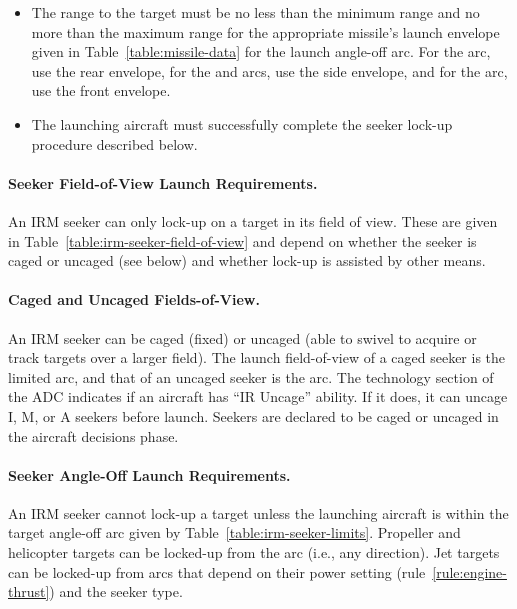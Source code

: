 {\begin{itemize}
    \item The range to the target must be no less than the minimum range and no more than the maximum range for the appropriate missile’s launch envelope given in Table~\ref{table:missile-data} for the launch angle-off arc. For the  arc, use the rear envelope, for the  and  arcs, use the side envelope, and for the  arc, use the front envelope.
    
    \item The launching aircraft must successfully complete the seeker lock-up procedure described below.
    
\end{itemize}

\paragraph{Seeker Field-of-View Launch Requirements.} 
An IRM seeker can only lock-up on a target in its field of view. These are given in Table~\ref{table:irm-seeker-field-of-view} and depend on whether the seeker is caged or uncaged (see below) and whether lock-up is assisted by other means.

\paragraph{Caged and Uncaged Fields-of-View.} \label{rule:ir-uncage} 
An IRM seeker can be caged (fixed) or uncaged (able to swivel to acquire or track targets over a larger field). The launch field-of-view of a caged seeker is the limited arc, and that of an uncaged seeker is the  arc. The technology section of the ADC indicates if an aircraft has “IR Uncage” ability. If it does, it can uncage I, M, or A seekers before launch. Seekers are declared to be caged or uncaged in the aircraft decisions phase.





\paragraph{Seeker Angle-Off Launch Requirements.} An IRM seeker cannot lock-up a target unless the launching aircraft is within the target angle-off arc given by Table~\ref{table:irm-seeker-limits}. Propeller and helicopter targets can be locked-up from the  arc (i.e., any direction). Jet targets can be locked-up from arcs that depend on their power setting (rule~\ref{rule:engine-thrust}) and the seeker type.

}
